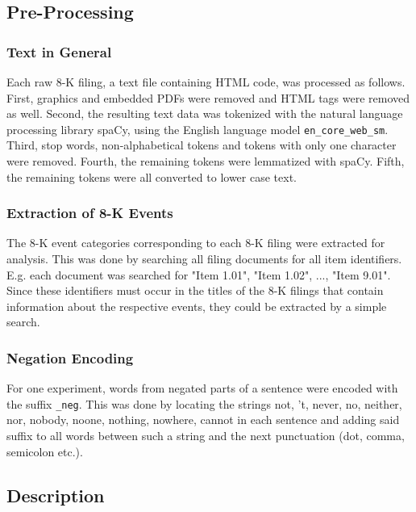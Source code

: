 \documentclass{article}
\begin{document}
	\subsection{Pre-Processing}
	
	\subsubsection{Text in General}
	
	Each raw 8-K filing, a text file containing HTML code, was processed as follows. First, graphics and embedded PDFs were removed and HTML tags were removed as well. Second, the resulting text data was tokenized with the natural language processing library spaCy, using the English language model \lstinline{en_core_web_sm}. Third, stop words, non-alphabetical tokens and tokens with only one character were removed. Fourth, the remaining tokens were lemmatized with spaCy. Fifth, the remaining tokens were all converted to lower case text.
	
	\subsubsection{Extraction of 8-K Events}
	
	The 8-K event categories corresponding to each 8-K filing were extracted for analysis. This was done by searching all filing documents for all item identifiers. E.g. each document was searched for "Item 1.01", "Item 1.02", ..., "Item 9.01". Since these identifiers must occur in the titles of the 8-K filings that contain information about the respective events, they could be extracted by a simple search. 
	
	\subsubsection{Negation Encoding}
	
	For one experiment, words from negated parts of a sentence were encoded with the suffix \lstinline{_neg}. This was done by locating the strings not, 't, never, no, neither, nor, nobody, noone, nothing, nowhere, cannot in each sentence and adding said suffix to all words between such a string and the next punctuation (dot, comma, semicolon etc.). 
	

	\subsection{Description}
	
\end{document}
